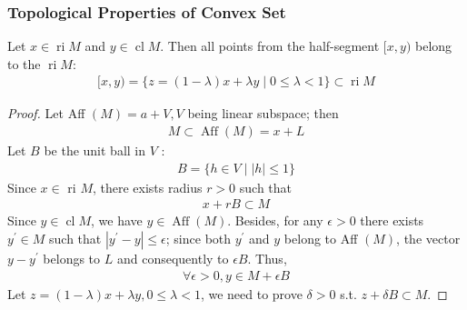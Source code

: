 \documentclass{article}
\newcommand{\ri}{\operatorname{ri}}
\begin{document}
\subsubsection{Topological Properties of Convex Set}
\begin{lema}\label{lem:ri_cl}
Let $x \in \operatorname{ri} M$ and $y \in \operatorname{cl} M .$ Then all points from the half-segment $[x, y)$ belong to the $\ri M$:
\begin{align*}
[x, y)=\{z=(1-\lambda) x+\lambda y \mid 0 \leq \lambda<1\}\subset \ri M
\end{align*}

\end{lema}
\begin{proof}\color{ForestGreen}
Let Aff $(M)=a+V, V$ being linear subspace; then
\begin{align*}
M \subset \operatorname{Aff}(M)=x+L
\end{align*}
Let $B$ be the unit ball in $V$ :
\begin{align*}
B=\{h \in V\mid| h|  \leq 1\}
\end{align*}
Since $x \in$ ri $M$, there exists radius $r>0$ such that
\begin{align*}
x+r B \subset M
\end{align*}
Since $y \in \operatorname{cl} M$, we have $y \in \operatorname{Aff}(M)$. Besides, for any $\epsilon>0$ there exists $y^{\prime} \in M$ such that $\left|y^{\prime}-y\right| \leq \epsilon$; since both $y^{\prime}$ and $y$ belong to Aff $(M)$, the vector $y-y^{\prime}$ belongs to $L$ and consequently to $\epsilon B$. Thus,
\begin{align*}
\forall \epsilon>0, y \in M+\epsilon B
\end{align*}
Let $z=(1-\lambda) x+\lambda y, 0 \leq \lambda<1$, we need to prove $\delta>0$ s.t. $z+\delta B\subset M$. 


\end{proof}
\end{document}
